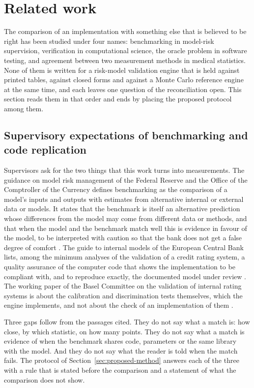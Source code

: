 \section{Related work}
\label{sec:related-work}

The comparison of an implementation with something else that is believed to be right has been studied under four names: benchmarking in model-risk supervision, verification in computational science, the oracle problem in software testing, and agreement between two measurement methods in medical statistics. None of them is written for a risk-model validation engine that is held against printed tables, against closed forms and against a Monte Carlo reference engine at the same time, and each leaves one question of the reconciliation open. This section reads them in that order and ends by placing the proposed protocol among them.

\subsection{Supervisory expectations of benchmarking and code replication}
\label{sec:rw-supervision}

Supervisors ask for the two things that this work turns into measurements. The guidance on model risk management of the Federal Reserve and the Office of the Comptroller of the Currency defines benchmarking as the comparison of a model's inputs and outputs with estimates from alternative internal or external data or models. It states that the benchmark is itself an alternative prediction whose differences from the model may come from different data or methods, and that when the model and the benchmark match well this is evidence in favour of the model, to be interpreted with caution so that the bank does not get a false degree of comfort \citep{fed2011sr117}. The guide to internal models of the European Central Bank lists, among the minimum analyses of the validation of a credit rating system, a quality assurance of the computer code that shows the implementation to be compliant with, and to reproduce exactly, the documented model under review \citep{ecb2025guide}. The working paper of the Basel Committee on the validation of internal rating systems is about the calibration and discrimination tests themselves, which the engine implements, and not about the check of an implementation of them \citep{bcbswp14}.

Three gaps follow from the passages cited. They do not say what a match is: how close, by which statistic, on how many points. They do not say what a match is evidence of when the benchmark shares code, parameters or the same library with the model. And they do not say what the reader is told when the match fails. The protocol of Section~\ref{sec:proposed-method} answers each of the three with a rule that is stated before the comparison and a statement of what the comparison does not show.

